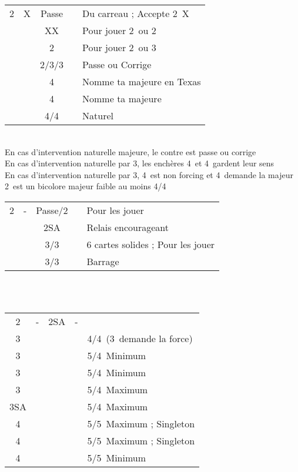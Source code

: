 \documentclass[a4paper, oneside, 11pt]{report}
\begin{document}
	\begin{tabular}{cccc|l}
	2\carreau & X & Passe && Du carreau ; Accepte 2\carreau\ X\\
	&& XX && Pour jouer 2\coeur\ ou 2\pique\\
	&& 2\coeur && Pour jouer 2\coeur\ ou 3\pique\\
	&& 2\pique/3\coeur/3\pique && Passe ou Corrige\\
	&& 4\trefle && Nomme ta majeure en Texas\\
	&& 4\carreau && Nomme ta majeure\\
	&& 4\coeur/4\pique && Naturel\\
	\end{tabular}\\
	En cas d'intervention naturelle majeure, le contre est passe ou corrige\\	
	En cas d'intervention naturelle par 3\trefle, les enchères 4\trefle\ et 4\carreau\ gardent leur sens\\	
	En cas d'intervention naturelle par 3\carreau, 4\trefle\ est non forcing et 4\carreau\ demande la majeur\\

	2\coeur\ est un bicolore majeur faible au moins 4/4\\

	\begin{tabular}{cccc|l}
	2\coeur & - & Passe/2\pique && Pour les jouer\\
	&& 2SA && Relais encourageant\\
	&& 3\trefle/3\carreau && 6 cartes solides ; Pour les jouer\\
	&& 3\coeur/3\pique && Barrage\\
	\end{tabular}\\\\

	\begin{tabular}{cccc|l}
	2\coeur & - & 2SA & - &\\
	3\trefle &&&& 4\coeur/4\pique\ (3\carreau\ demande la force)\\
	3\carreau &&&& 5\coeur/4\pique\ Minimum\\
	3\coeur &&&& 5\pique/4\coeur\ Minimum\\
	3\pique &&&& 5\coeur/4\pique\ Maximum\\
	3SA &&&& 5\pique/4\coeur\ Maximum\\
	4\trefle &&&& 5\coeur/5\pique\ Maximum ; Singleton \trefle\\
	4\carreau &&&& 5\coeur/5\pique\ Maximum ; Singleton \carreau\\
	4\coeur &&&& 5\coeur/5\pique\ Minimum\\
	\end{tabular}\\
\end{document}
